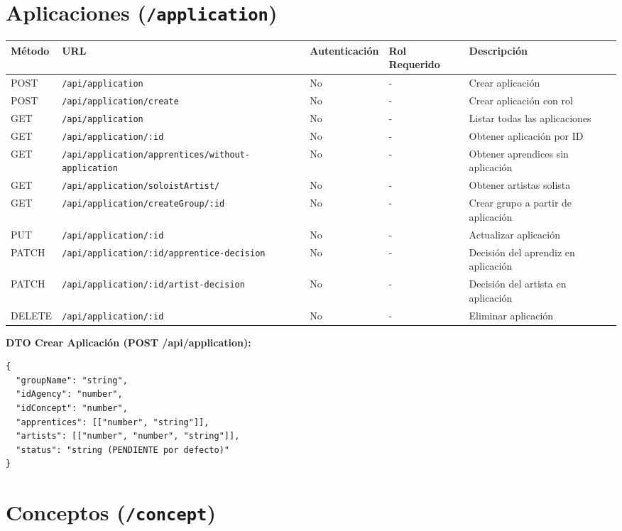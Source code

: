 \documentclass[11pt]{article}
\begin{document}
\section{Aplicaciones (\texttt{/application})}

\begin{longtable}{lllll}
\toprule
\textbf{Método} & \textbf{URL} & \textbf{Autenticación} & \textbf{Rol Requerido} & \textbf{Descripción} \\
\midrule
\endhead
POST & \texttt{/api/application} & No & - & Crear aplicación \\
POST & \texttt{/api/application/create} & No & - & Crear aplicación con rol \\
GET & \texttt{/api/application} & No & - & Listar todas las aplicaciones \\
GET & \texttt{/api/application/:id} & No & - & Obtener aplicación por ID \\
GET & \texttt{/api/application/apprentices/without-application} & No & - & Obtener aprendices sin aplicación \\
GET & \texttt{/api/application/soloistArtist/} & No & - & Obtener artistas solista \\
GET & \texttt{/api/application/createGroup/:id} & No & - & Crear grupo a partir de aplicación \\
PUT & \texttt{/api/application/:id} & No & - & Actualizar aplicación \\
PATCH & \texttt{/api/application/:id/apprentice-decision} & No & - & Decisión del aprendiz en aplicación \\
PATCH & \texttt{/api/application/:id/artist-decision} & No & - & Decisión del artista en aplicación \\
DELETE & \texttt{/api/application/:id} & No & - & Eliminar aplicación \\
\bottomrule
\end{longtable}

\textbf{DTO Crear Aplicación (POST /api/application):}
\begin{Verbatim}
{
  "groupName": "string",
  "idAgency": "number",
  "idConcept": "number",
  "apprentices": [["number", "string"]],
  "artists": [["number", "number", "string"]],
  "status": "string (PENDIENTE por defecto)"
}
\end{Verbatim}

\section{Conceptos (\texttt{/concept})}
\end{document}
